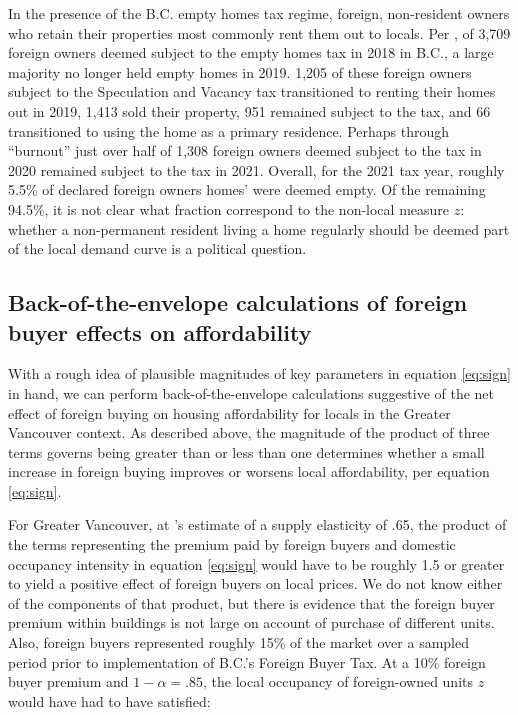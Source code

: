 \documentclass[12pt]{article}
\begin{document}
In the presence of the B.C. empty homes tax regime, foreign, non-resident
owners who retain their properties most commonly rent them out to locals. Per
\textcite{specTax2019}, of 3,709 foreign owners deemed subject to the empty
homes tax in 2018 in B.C., a large majority no longer held empty homes in 2019.
1,205 of these foreign owners subject to the Speculation and Vacancy tax
transitioned to renting their homes out in 2019, 1,413 sold their property, 951
remained subject to the tax, and 66 transitioned to using the home as a primary
residence. Perhaps through ``burnout'' just over half of 1,308 foreign owners
deemed subject to the tax in 2020 remained subject to the tax in 2021. Overall,
for the 2021 tax year, roughly 5.5\% of declared foreign owners homes' were
deemed empty. Of the remaining 94.5\%, it is not clear what fraction correspond
to the non-local measure $z$: whether a non-permanent resident living a home
regularly should be deemed part of the local demand curve is a political
question.

\subsection{Back-of-the-envelope calculations of foreign buyer effects on affordability}

With a rough idea of plausible magnitudes of key parameters in equation
\eqref{eq:sign} in hand, we can perform back-of-the-envelope calculations
suggestive of the net effect of foreign buying on housing affordability for
locals in the Greater Vancouver context. As described above, the magnitude of
the product of three terms governs being greater than or less than one
determines whether a small increase in foreign buying improves or worsens local
affordability, per equation \eqref{eq:sign}. 

For Greater Vancouver, at \textcite{paixao2021housing}'s estimate of a supply
elasticity of .65, the product of the terms representing the premium paid by
foreign buyers and domestic occupancy intensity in equation \eqref{eq:sign}
would have to be roughly 1.5 or greater to yield a positive effect of foreign
buyers on local prices. We do not know either of the components of that
product, but there is evidence that the foreign buyer premium within buildings
is not large on account of purchase of different units. Also, foreign buyers
represented roughly 15\% of the market over a sampled period prior to
implementation of B.C.'s Foreign Buyer Tax. At a 10\% foreign buyer premium and
$1-\alpha=.85$, the local occupancy of foreign-owned units $z$ would have had
to have satisfied:
\end{document}
